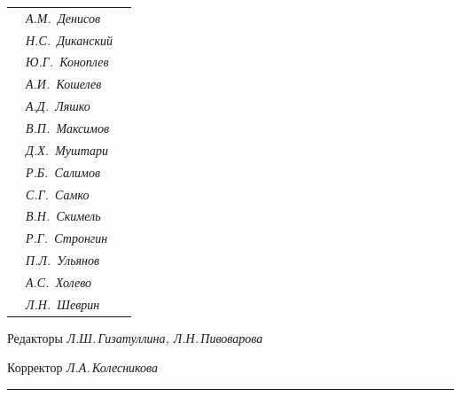 \begin{tabular}{p{63mm}p{40mm}p{50mm}}
                               &   \it А.М.~Денисов & \\


                               &   \it Н.С.~Диканский & \\


                               &   \it Ю.Г.~Коноплев & \\


                               &   \it А.И.~Кошелев  & \\


                               &   \it А.Д.~Ляшко  & \\


                               &   \it В.П.~Максимов  & \\


                               &   \it Д.Х.~Муштари & \\


                               &   \it Р.Б.~Салимов  & \\


                               &   \it С.Г.~Самко  & \\


                               &   \it В.Н.~Скимель &  \\


                               &   \it Р.Г.~Стронгин  & \\


                               &   \it П.Л.~Ульянов  & \\


                               &   \it А.С.~Холево  & \\


                               &   \it Л.Н.~Шеврин  & \\


\end{tabular} 


\bigskip 


\bigskip 


\bigskip 





 


\centerline{Редакторы \it Л.Ш.\,Гизатуллина, Л.Н.\,Пивоварова}


\centerline{Корректор \it Л.А.\,Колесникова}


\bigskip 


\hrule 


